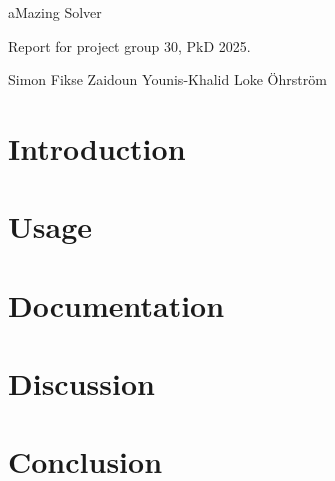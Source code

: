 \documentclass[12pt, a4paper]{article}
\begin{document}
\begin{titlepage}

    \begin{center}

        \begin{LARGE}
            aMazing Solver
        \end{LARGE}

        \vspace{5mm}

        \begin{large}
            Report for project group 30, PkD 2025.
        \end{large}

        \vspace{5mm}

        Simon Fikse \quad Zaidoun Younis-Khalid \quad Loke Öhrström

    \end{center}
\end{titlepage}

\newpage
\tableofcontents
\newpage

\section{Introduction}

\section{Usage}

\section{Documentation}

\newpage



\newpage

\section{Discussion}

\section{Conclusion}
\end{document}
